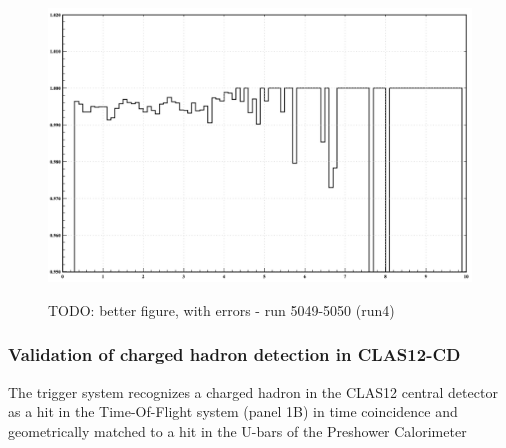 \begin{figure}[!htb]
 \centering
{\includegraphics[width=.5\textwidth]{img/FD_TrackEfficiency.png}}
 \caption{TODO: better figure, with errors - run 5049-5050 (run4)}
 \label{fig:FD_TrackEfficiency}
\end{figure}



\subsubsection{Validation of charged hadron detection in CLAS12-CD}

The trigger system recognizes a charged hadron in the CLAS12 central detector as a hit in the Time-Of-Flight system (panel 1B) in time coincidence and geometrically matched to a hit in the U-bars of the Preshower Calorimeter

